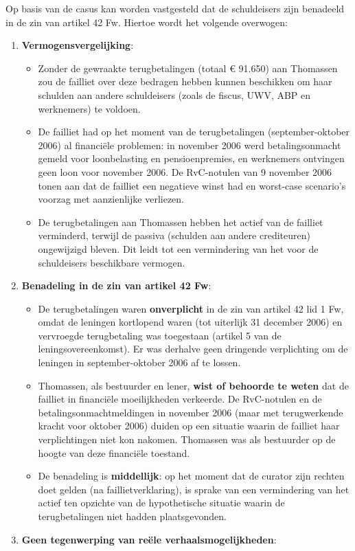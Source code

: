 \documentclass[
  dutch,
  a4paper,
]{article}
\providecommand{\tightlist}{%
  \setlength{\itemsep}{0pt}\setlength{\parskip}{0pt}}
\begin{document}
Op basis van de casus kan worden vastgesteld dat de schuldeisers zijn benadeeld in de zin van artikel 42 Fw. Hiertoe wordt het volgende overwogen:

\begin{enumerate}
\def\labelenumi{\arabic{enumi}.}
\tightlist
\item
  \textbf{Vermogensvergelijking}:

  \begin{itemize}
  \tightlist
  \item
    Zonder de gewraakte terugbetalingen (totaal € 91.650) aan Thomassen zou de failliet over deze bedragen hebben kunnen beschikken om haar schulden aan andere schuldeisers (zoals de fiscus, UWV, ABP en werknemers) te voldoen.
  \item
    De failliet had op het moment van de terugbetalingen (september-oktober 2006) al financiële problemen: in november 2006 werd betalingsonmacht gemeld voor loonbelasting en pensioenpremies, en werknemers ontvingen geen loon voor november 2006. De RvC-notulen van 9 november 2006 tonen aan dat de failliet een negatieve winst had en worst-case scenario's voorzag met aanzienlijke verliezen.
  \item
    De terugbetalingen aan Thomassen hebben het actief van de failliet verminderd, terwijl de passiva (schulden aan andere crediteuren) ongewijzigd bleven. Dit leidt tot een vermindering van het voor de schuldeisers beschikbare vermogen.
  \end{itemize}
\item
  \textbf{Benadeling in de zin van artikel 42 Fw}:

  \begin{itemize}
  \tightlist
  \item
    De terugbetalingen waren \textbf{onverplicht} in de zin van artikel 42 lid 1 Fw, omdat de leningen kortlopend waren (tot uiterlijk 31 december 2006) en vervroegde terugbetaling was toegestaan (artikel 5 van de leningsovereenkomst). Er was derhalve geen dringende verplichting om de leningen in september-oktober 2006 af te lossen.
  \item
    Thomassen, als bestuurder en lener, \textbf{wist of behoorde te weten} dat de failliet in financiële moeilijkheden verkeerde. De RvC-notulen en de betalingsonmachtmeldingen in november 2006 (maar met terugwerkende kracht voor oktober 2006) duiden op een situatie waarin de failliet haar verplichtingen niet kon nakomen. Thomassen was als bestuurder op de hoogte van deze financiële toestand.
  \item
    De benadeling is \textbf{middellijk}: op het moment dat de curator zijn rechten doet gelden (na faillietverklaring), is sprake van een vermindering van het actief ten opzichte van de hypothetische situatie waarin de terugbetalingen niet hadden plaatsgevonden.
  \end{itemize}
\item
  \textbf{Geen tegenwerping van reële verhaalsmogelijkheden}:


\end{enumerate}
\end{document}
